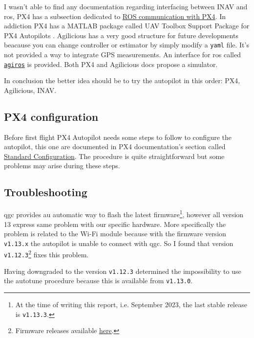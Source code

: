 I wasn't able to find any documentation regarding interfacing between INAV and \ac{ros}, PX4 has a subsection dedicated to \href{https://docs.px4.io/main/en/ros/}{ROS communication with PX4}. In addiction PX4 has a MATLAB package called UAV Toolbox Support Package for PX4 Autopilots \cite{mathworkspx4}. 
Agilicious has a very good structure for future developments beacause you can change controller or estimator by simply modify a \texttt{yaml} file. It's not provided a way to integrate GPS measurements. An interface  for \ac{ros} called \href{https://agilicious.readthedocs.io/en/main/integration/ros.html}{\texttt{agiros}} is provided. Both PX4 and Agilicious docs propose a simulator.  

In conclusion the better idea should be to try the autopilot in this order: PX4, Agilicious, INAV.


\subsection{PX4 configuration}
Before first flight PX4 Autopilot needs some steps to follow to configure the autopilot, this one are documented in PX4 documentation's section called \href{https://docs.px4.io/main/en/config/}{Standard Configuration}. The procedure is quite straightforward but some problems may arise during these steps.

\subsection*{Troubleshooting}
\begin{description}[style=nextline]
	\item[Firmware version] \ac{qgc} provides au automatic way to flash the latest firmware\footnote{At the time of writing this report, i.e. September 2023, the last stable release is \texttt{v1.13.3}.}, however all version 13 express same problem with our specific hardware. More specifically the problem is related to the Wi-Fi module because with the firmware version \texttt{v1.13.x} the autopilot is unable to connect with \ac{qgc}. So I found that version \texttt{v1.12.3}\footnote{Firmware releases available \href{https://github.com/PX4/PX4-Autopilot/releases}{here}.} fixes this problem.
	\item [Autotune] Having downgraded to the version \texttt{v1.12.3} determined the impossibility to use the autotune procedure because this is available from \texttt{v1.13.0}.
\end{description}

